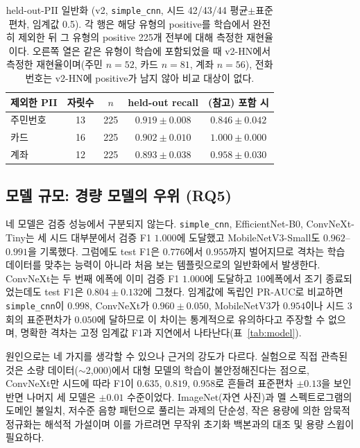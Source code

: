 \documentclass[10pt,twocolumn]{article}
\begin{document}
\begin{table}[!t]
\centering
\caption{held-out-PII 일반화 (v2, \texttt{simple\_cnn}, 시드 42/43/44 평균$\pm$표준편차,
임계값 0.5). 각 행은 해당 유형의 positive를 학습에서 완전히 제외한 뒤 그 유형의 positive
225개 전부에 대해 측정한 재현율이다. 오른쪽 열은 같은 유형이 학습에 포함되었을 때 v2-HN에서
측정한 재현율이며(주민 $n=52$, 카드 $n=81$, 계좌 $n=56$), 전화번호는 v2-HN에 positive가 남지
않아 비교 대상이 없다.}
\label{tab:heldout}
\footnotesize
\setlength{\tabcolsep}{4pt}
\begin{tabular}{lcccc}
\toprule
제외한 PII & 자릿수 & $n$ & held-out recall & (참고) 포함 시 \\
\midrule
주민번호 & 13 & 225 & $0.919\pm0.008$ & $0.846\pm0.042$ \\
카드     & 16 & 225 & $0.902\pm0.010$ & $1.000\pm0.000$ \\
계좌     & 12 & 225 & $0.893\pm0.038$ & $0.958\pm0.030$ \\
\bottomrule
\end{tabular}
\end{table}

\subsection{모델 규모: 경량 모델의 우위 (RQ5)}
네 모델은 검증 성능에서 구분되지 않는다. \texttt{simple\_cnn}, EfficientNet-B0, ConvNeXt-Tiny는
세 시드 대부분에서 검증 F1 $1.000$에 도달했고 MobileNetV3-Small도 $0.962$--$0.991$을 기록했다.
그럼에도 test F1은 $0.776$에서 $0.955$까지 벌어지므로 격차는 학습 데이터를 맞추는 능력이 아니라
처음 보는 템플릿으로의 일반화에서 발생한다. ConvNeXt는 두 번째 에폭에 이미 검증 F1 $1.000$에
도달하고 10에폭에서 조기 종료되었는데도 test F1은 $0.804\pm0.132$에 그쳤다. 임계값에 독립인
PR-AUC로 비교하면 \texttt{simple\_cnn}이 $0.998$, ConvNeXt가 $0.960\pm0.050$, MobileNetV3가
$0.954$이나 시드 3회의 표준편차가 $0.050$에 달하므로 이 차이는 통계적으로 유의하다고 주장할 수
없으며, 명확한 격차는 고정 임계값 F1과 지연에서 나타난다(표~\ref{tab:model}).

원인으로는 네 가지를 생각할 수 있으나 근거의 강도가 다르다. 실험으로 직접 관측된 것은 소량
데이터($\sim$2{,}000)에서 대형 모델의 학습이 불안정해진다는 점으로, ConvNeXt만 시드에 따라 F1이
$0.635$, $0.819$, $0.958$로 흔들려 표준편차 $\pm0.13$을 보인 반면 나머지 세 모델은 $\pm0.01$
수준이었다. ImageNet(자연 사진)과 멜 스펙트로그램의 도메인 불일치, 저수준 음향 패턴으로 풀리는
과제의 단순성, 작은 용량에 의한 암묵적 정규화는 해석적 가설이며 이를 가르려면 무작위 초기화
백본과의 대조 및 용량 스윕이 필요하다.
\end{document}
